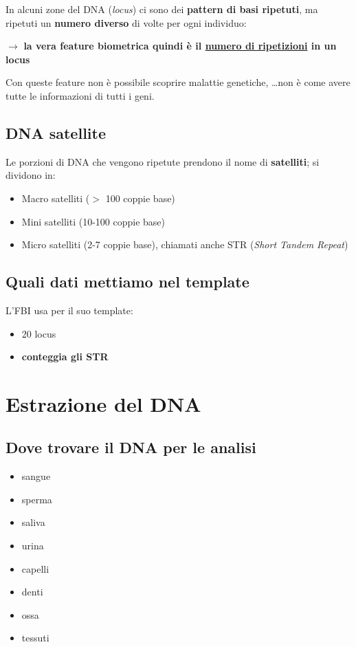 \documentclass{report}
\begin{document}
\noindent In alcuni zone del DNA (\textit{locus}) ci sono dei \textbf{pattern di basi ripetuti},
ma ripetuti un \textbf{numero diverso} di volte per ogni individuo:

$\rightarrow$ \textbf{la vera feature biometrica quindi è il \underline{numero di 
ripetizioni} in un locus}

\noindent Con queste feature non è possibile scoprire malattie genetiche, \dots non è come 
avere tutte le informazioni di tutti i geni.

\subsection{DNA satellite}
Le porzioni di DNA che vengono ripetute prendono il nome di \textbf{satelliti}; si dividono 
in:
\begin{itemize}
    \item Macro satelliti ($>$ 100 coppie base)
    \item Mini satelliti (10-100 coppie base)
    \item Micro satelliti (2-7 coppie base), chiamati anche STR (\textit{Short Tandem Repeat})
\end{itemize}

\subsection{Quali dati mettiamo nel template}

L'FBI usa per il suo template:
\begin{itemize}
    \item 20 locus 
    \item \textbf{conteggia gli STR} 
\end{itemize}


\section{Estrazione del DNA}
\subsection{Dove trovare il DNA per le analisi}
\begin{itemize}
    \item sangue 
    \item sperma 
    \item saliva
    \item urina 
    \item capelli 
    \item denti 
    \item ossa 
    \item tessuti
\end{itemize}
\end{document}

